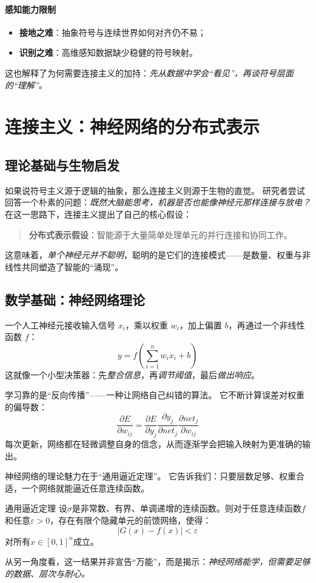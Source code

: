\paragraph{感知能力限制}
\begin{itemize}
\item \textbf{接地之难}：抽象符号与连续世界如何对齐仍不易；
\item \textbf{识别之难}：高维感知数据缺少稳健的符号映射。
\end{itemize}
这也解释了为何需要连接主义的加持：\emph{先从数据中学会“看见”，再谈符号层面的“理解”。}

\section{连接主义：神经网络的分布式表示}

\subsection{理论基础与生物启发}

如果说符号主义源于逻辑的抽象，那么连接主义则源于生物的直觉。  
研究者尝试回答一个朴素的问题：\emph{既然大脑能思考，机器是否也能像神经元那样连接与放电？}  
在这一思路下，连接主义提出了自己的核心假设：

\begin{quote}
\textbf{分布式表示假设}：智能源于大量简单处理单元的并行连接和协同工作。
\end{quote}
这意味着，\emph{单个神经元并不聪明}，聪明的是它们的连接模式——是数量、权重与非线性共同塑造了智能的“涌现”。

\subsection{数学基础：神经网络理论}

一个人工神经元接收输入信号 $x_i$，乘以权重 $w_i$，加上偏置 $b$，再通过一个非线性函数 $f$：  
$$y = f\left(\sum_{i=1}^{n} w_i x_i + b\right)$$
这就像一个小型决策器：先\emph{整合信息}，再\emph{调节阈值}，最后\emph{做出响应}。

学习靠的是“反向传播”——一种让网络自己纠错的算法。  
它不断计算误差对权重的偏导数：
$$\frac{\partial E}{\partial w_{ij}} = \frac{\partial E}{\partial y_j} \frac{\partial y_j}{\partial net_j} \frac{\partial net_j}{\partial w_{ij}}$$
每次更新，网络都在轻微调整自身的信念，从而逐渐学会把输入映射为更准确的输出。

神经网络的理论魅力在于“通用逼近定理”。  
它告诉我们：只要层数足够、权重合适，一个网络就能逼近任意连续函数。  
\begin{theorem}[]{通用逼近定理}
设$\sigma$是非常数、有界、单调递增的连续函数。则对于任意连续函数$f$和任意$\varepsilon > 0$，存在有限个隐藏单元的前馈网络，使得：
$$\left|G(x) - f(x)\right| < \varepsilon$$
对所有$x \in [0,1]^n$成立。
\end{theorem}
从另一角度看，这一结果并非宣告“万能”，而是揭示：\emph{神经网络能学，但需要足够的数据、层次与耐心。}

